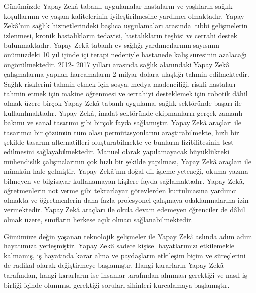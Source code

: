 \documentclass{article}
\begin{document}
\begin{multicols}{2}
Günümüzde Yapay Zekâ tabanlı uygulamalar hastaların ve yaşlıların sağlık koşullarının ve yaşam kalitelerinin iyileştirilmesine yardımcı olmaktadır. Yapay
Zekâ’nın sağlık hizmetlerindeki başlıca uygulamaları arasında, tıbbi gelişmelerin izlenmesi, kronik hastalıkların tedavisi, hastalıkların teşhisi ve cerrahi destek
bulunmaktadır. Yapay Zekâ tabanlı ev sağlığı yardımcılarının sayısının önümüzdeki 10 yıl içinde %
içi terapi nedeniyle hastanede kalış süresinin azalacağı öngörülmektedir. 2012-
2017 yılları arasında sağlık alanındaki Yapay Zekâ çalışmalarına yapılan harcamaların 2 milyar dolara ulaştığı tahmin edilmektedir. Sağlık risklerini tahmin
etmek için sosyal medya madenciliği, riskli hastaları tahmin etmek için makine
öğrenmesi ve cerrahiyi desteklemek için robotik dâhil olmak üzere birçok Yapay
Zekâ tabanlı uygulama, sağlık sektöründe başarı ile kullanılmaktadır.
Yapay Zekâ, imalat sektöründe ekipmanların gerçek zamanlı bakımı ve sanal
tasarımı gibi birçok fayda sağlamıştır. Yapay Zekâ araçları ile tasarımcı bir çözümün tüm olası permütasyonlarını araştırabilmekte, hızlı bir şekilde tasarım
alternatifleri oluşturabilmekte ve bunların fizibilitesinin test edilmesini sağlayabilmektedir. Manuel olarak yapılamayacak büyüklükteki mühendislik çalışmalarının çok hızlı bir şekilde yapılması, Yapay Zekâ araçları ile mümkün hale
gelmiştir.
Yapay Zekâ’nın doğal dil işleme yeteneği, okuma yazma bilmeyen ve bilgisayar kullanamayan kişilere fayda sağlamaktadır. Yapay Zekâ, öğretmenlerin not
verme gibi tekrarlayan görevlerden kurtulmasına yardımcı olmakta ve öğretmenlerin daha fazla profesyonel çalışmaya odaklanmalarına izin vermektedir.
Yapay Zekâ araçları ile okula devam edemeyen öğrenciler de dâhil olmak üzere,
sınıfların herkese açık olması sağlanabilmektedir.

\vspace{5pt}
Günümüze değin yaşanan teknolojik gelişmeler ile Yapay Zekâ aslında adım
adım hayatımıza yerleşmiştir. Yapay Zekâ sadece kişisel hayatlarımızı etkilemekle kalmamış, iş hayatında karar alma ve paydaşların etkileşim biçim ve süreçlerini de radikal olarak değiştirmeye başlamıştır. Hangi kararların Yapay Zekâ
tarafından, hangi kararların ise insanlar tarafından alınması gerektiği ve nasıl
iş birliği içinde olunması gerektiği soruları zihinleri kurcalamaya başlamıştır.


\end{multicols}
\end{document}
